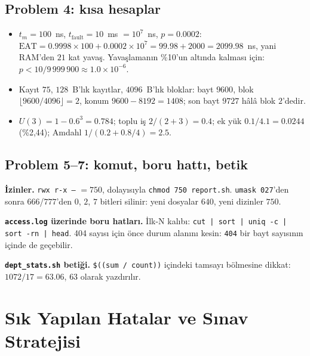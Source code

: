 \documentclass[11pt,a4paper]{article}
\newcommand{\cmd}[1]{\texttt{#1}}
\begin{document}
\subsection{Problem 4: kısa hesaplar}
\begin{itemize}
  \item $t_m = 100$~ns, $t_{\text{fault}} = 10$~ms $= 10^{7}$~ns, $p = 0.0002$: $\text{EAT} = 0.9998 \times 100 + 0.0002 \times 10^{7} = 99.98 + 2000 = 2099.98$~ns, yani RAM'den $21$ kat yavaş. Yavaşlamanın \%10'un altında kalması için: $p < 10/9\,999\,900 \approx 1.0\times10^{-6}$.
  \item Kayıt $75$, $128$~B'lık kayıtlar, $4096$~B'lık bloklar: bayt $9600$, blok $\lfloor 9600/4096 \rfloor = 2$, konum $9600 - 8192 = 1408$; son bayt $9727$ hâlâ blok $2$'dedir.
  \item $U(3) = 1 - 0.6^{3} = 0.784$; toplu iş $2/(2+3) = 0.4$; ek yük $0.1/4.1 = 0.0244$ (\%2,44); Amdahl $1/(0.2 + 0.8/4) = 2.5$.
\end{itemize}

\subsection{Problem 5--7: komut, boru hattı, betik}
\textbf{İzinler.} \texttt{rwx r-x ---} $= 750$, dolayısıyla \cmd{chmod 750 report.sh}. \cmd{umask 027}'den sonra $666$/$777$'den $0$, $2$, $7$ bitleri silinir: yeni dosyalar $640$, yeni dizinler $750$.

\textbf{\texttt{access.log} üzerinde boru hatları.} İlk-N kalıbı: \cmd{cut | sort | uniq -c | sort -rn | head}. 404 sayısı için önce durum alanını kesin: \texttt{404} bir bayt sayısının içinde de geçebilir.

\textbf{\texttt{dept\_stats.sh} betiği.} \texttt{\$((sum / count))} içindeki tamsayı bölmesine dikkat: $1072/17 = 63.06$, $63$ olarak yazdırılır.



\section{Sık Yapılan Hatalar ve Sınav Stratejisi}
\label{sec:mistakes}
\end{document}
